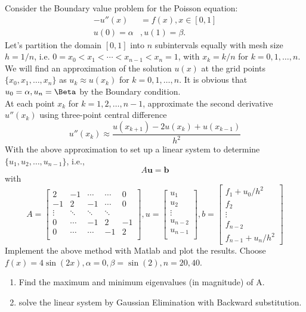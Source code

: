 \documentclass[10pt]{jhwhw}
\begin{document}
	Consider the Boundary value problem for the Poisson equation:
	\begin{align*}
		-u''(x) &= f(x), x\in [0,1] \\
		u(0) = \alpha&, u(1) = \beta.
	\end{align*}
	Let's partition the domain $[0,1]$ into $n$ subintervals equally with mesh size
	$h=1/n$, i.e. $0=x_0 < x_1 < \cdots < x_{n-1} < x_n = 1$, with $x_k = k/n$ for
	$k = 0, 1, \ldots, n$. We will find an approximation of the solution $u(x)$ at the grid
	points $\{x_0, x_1, \ldots, x_n\}$ as $u_k \approx u(x_k)$ for $k=0,1,\ldots,n$.
	It is obvious that $u_0 = \alpha, u_n = \Beta$ by the Boundary condition. \\
	At each point $x_k$ for $k=1,2,\ldots,n-1$, approximate the second derivative $u''(x_k)$
	using three-point central difference
	$$
		u''(x_k) \approx \frac{u(x_{k+1}) - 2u(x_k) + u(x_{k-1})}{h^2}
	$$
	With the above approximation to set up a linear system to determine
	$\{u_1, u_2, \ldots, u_{n-1}\}$, i.e.,
	$$
		A\mathbf{u} = \mathbf{b}
	$$
	with 
	$$
	A = \begin{bmatrix}
		2 & -1 & \cdots & \cdots & 0 \\
		-1 & 2 & -1 & \cdots & 0 \\
		\vdots & \ddots & \ddots & \ddots & \\
		0 & \cdots & -1 & 2 & -1 \\
		0 & \cdots & \cdots & -1 & 2 \\
	\end{bmatrix},
	u = \begin{bmatrix}
		u_1 \\
		u_2 \\
		\vdots \\
		u_{n-2} \\
		u_{n-1} \\
	\end{bmatrix},
	b = \begin{bmatrix}
		f_1 + u_0/h^2 \\
		f_2 \\
		\vdots \\
		f_{n-2} \\
		f_{n-1} + u_n/h^2
	\end{bmatrix}
	$$
	Implement the above method with Matlab and plot the results. 
	Choose $f(x) = 4\sin(2x), \alpha = 0, \beta = \sin(2), n=20,40$.
	\begin{enumerate}
		\item Find the maximum and minimum eigenvalues (in magnitude) of A.
		\item solve the linear system by Gaussian Elimination with Backward substitution.
	\end{enumerate}

\solution
\end{document}
